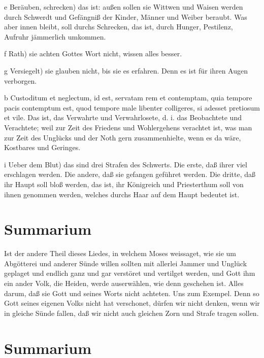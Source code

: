 e Beräuben, schrecken) das ist: außen sollen sie Wittwen und Waisen werden durch Schwerdt und Gefängniß der Kinder, Männer und Weiber beraubt. Was aber innen bleibt, soll durchs Schrecken, das ist, durch Hunger, Pestilenz, Aufruhr jämmerlich umkommen.

f Rath) sie achten Gottes Wort nicht, wissen alles besser.

g Versiegelt) sie glauben nicht, bis sie es erfahren. Denn es ist für ihren Augen verborgen.

b Custoditum et neglectum, id est, servatam rem et contemptam, quia tempore pacis contemptum est, quod tempore male libenter colligeres, si adesset pretiosum et vile. Das ist, das Verwahrte und Verwahrlosete, d. i. das Beobachtete und Verachtete; weil zur Zeit des Friedens und Wohlergehens verachtet ist, was man zur Zeit des Unglücks und der Noth gern zusammenhielte, wenn es da wäre, Kostbares und Geringes.

i Ueber dem Blut) das sind drei Strafen des Schwerts. Die erste, daß ihrer viel erschlagen werden. Die andere, daß sie gefangen geführet werden. Die dritte, daß ihr Haupt soll bloß werden, das ist, ihr Königreich und Priesterthum soll von ihnen genommen werden, welches durchs Haar auf dem Haupt bedeutet ist.

\section{Summarium}

Ist der andere Theil dieses Liedes, in welchem Moses weissaget, wie sie um Abgötterei und anderer Sünde willen sollten mit allerlei Jammer und Unglück geplaget und endlich ganz und gar verstöret und vertilget werden, und Gott ihm ein ander Volk, die Heiden, werde auserwählen, wie denn geschehen ist. Alles darum, daß sie Gott und seines Worts nicht achteten. Uns zum Exempel. Denn so Gott seines eigenen Volks nicht hat verschonet, dürfen wir nicht denken, wenn wir in gleiche Sünde fallen, daß wir nicht auch gleichen Zorn und Strafe tragen sollen.

\section{Summarium}

